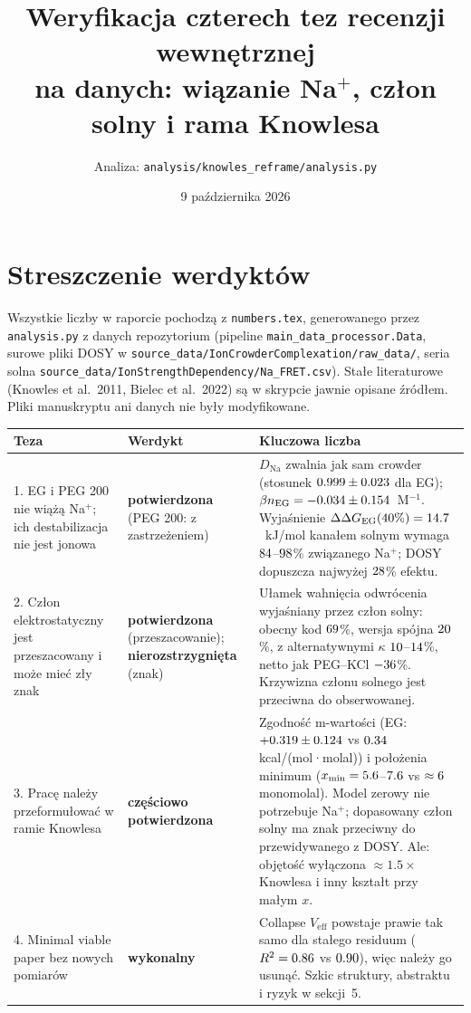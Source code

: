 \documentclass[10pt,a4paper]{article}
\title{Weryfikacja czterech tez recenzji wewnętrznej\\[2pt]
\large na danych: wiązanie Na$^+$, człon solny i rama Knowlesa}
\author{Analiza: \texttt{analysis/knowles\_reframe/analysis.py}}
\date{9 października 2026}
\newcommand{\dG}{\Delta\Delta G}
\begin{document}
\maketitle
\vspace{-1.5em}

\section*{Streszczenie werdyktów}

Wszystkie liczby w raporcie pochodzą z \texttt{numbers.tex}, generowanego przez \texttt{analysis.py} z danych repozytorium (pipeline \texttt{main\_data\_processor.Data}, surowe pliki DOSY w \texttt{source\_data/IonCrowderComplexation/raw\_data/}, seria solna \texttt{source\_data/IonStrengthDependency/Na\_FRET.csv}). Stałe literaturowe (Knowles et al.\ 2011, Bielec et al.\ 2022) są w skrypcie jawnie opisane źródłem. Pliki manuskryptu ani danych nie były modyfikowane.

\medskip
\renewcommand{\arraystretch}{1.25}
\begin{tabularx}{\linewidth}{@{}p{3.6cm}p{2.6cm}X@{}}
\toprule
\textbf{Teza} & \textbf{Werdykt} & \textbf{Kluczowa liczba} \\
\midrule
1. EG i PEG 200 nie wiążą Na$^+$; ich destabilizacja nie jest jonowa
 & \textcolor{green!50!black}{\textbf{potwierdzona}} (PEG 200: z zastrzeżeniem)
 & $D_\mathrm{Na}$ zwalnia jak sam crowder (stosunek $0.999\pm0.023$ dla EG); $\beta n_\mathrm{EG}=-0.034\pm0.154$~M$^{-1}$. Wyjaśnienie $\dG_\mathrm{EG}(40\%)=\NddGEGforty$~kJ/mol kanałem solnym wymaga $84$--$98$\% związanego Na$^+$; DOSY dopuszcza najwyżej $28$\% efektu. \\
2. Człon elektrostatyczny jest przeszacowany i może mieć zły znak
 & \textcolor{green!50!black}{\textbf{potwierdzona}} (przeszacowanie); \textcolor{orange!80!black}{\textbf{nierozstrzygnięta}} (znak)
 & Ułamek wahnięcia odwrócenia wyjaśniany przez człon solny: obecny kod $69$\%, wersja spójna $20$\%, z alternatywnymi $\kappa$ $10$--$14$\%, netto jak PEG--KCl $-36$\%. Krzywizna członu solnego jest przeciwna do obserwowanej. \\
3. Pracę należy przeformułować w ramie Knowlesa
 & \textcolor{orange!80!black}{\textbf{częściowo potwierdzona}}
 & Zgodność m-wartości (EG: $+0.319\pm0.124$ vs $0.34$ kcal/(mol·molal)) i położenia minimum ($x_\mathrm{min}=5.6$--$7.6$ vs $\approx6$ monomolal). Model zerowy nie potrzebuje Na$^+$; dopasowany człon solny ma znak przeciwny do przewidywanego z DOSY. Ale: objętość wyłączona $\approx1.5\times$ Knowlesa i inny kształt przy małym $x$. \\
4. Minimal viable paper bez nowych pomiarów
 & \textcolor{blue!70!black}{\textbf{wykonalny}}
 & Collapse $V_\mathrm{eff}$ powstaje prawie tak samo dla stałego residuum ($R^2=0.86$ vs $0.90$), więc należy go usunąć. Szkic struktury, abstraktu i ryzyk w sekcji~5. \\
\bottomrule
\end{tabularx}
\end{document}
